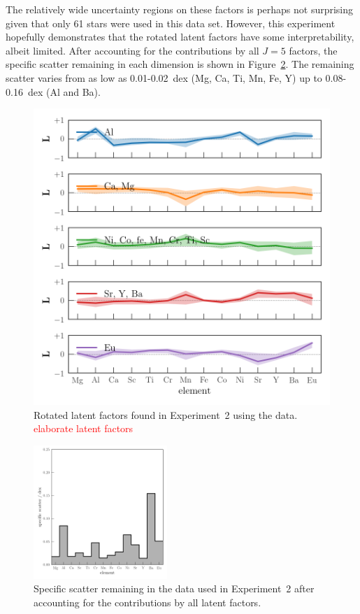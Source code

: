 \documentclass[twocolumn]{aastex61}
\newcommand{\todo}[1]{\textcolor{red}{#1}}
\begin{document}
The relatively wide uncertainty regions on these factors is perhaps not
surprising given that only 61 stars were used in this data set. However, this
experiment hopefully demonstrates that the rotated latent factors have some
interpretability, albeit limited. After accounting for the contributions by all
$J = 5$ factors, the specific scatter remaining in each dimension is shown in
Figure~\ref{fig:exp2-specific-scatter}. The remaining scatter varies from as low 
as 0.01-0.02~dex (Mg, Ca, Ti, Mn, Fe, Y) up to 0.08-0.16~dex (Al and Ba). 


\begin{figure}
	\includegraphics[width=\textwidth]{experiments/exp2-latent-factors.png}
	\caption{Rotated latent factors found in Experiment~2 using the \citet{Barklem:2005}
			 data. \todo{elaborate latent factors}}
    \label{fig:exp2-latent-factors}
\end{figure}



\begin{figure}
	\includegraphics[width=0.45\textwidth]{experiments/exp2-specific-scatter.png}
	\caption{Specific scatter remaining in the \citet{Barklem:2005} data used in
			 Experiment~2 after accounting for the contributions by all latent
			 factors.}
    \label{fig:exp2-specific-scatter}
\end{figure}
\end{document}
